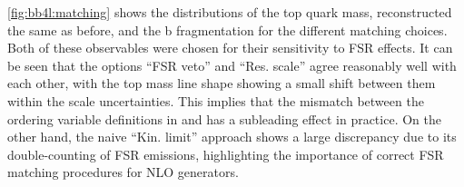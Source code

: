 \cref{fig:bb4l:matching} shows the distributions of the top quark mass, reconstructed the same as before, and the b fragmentation for the different matching choices. Both of these observables were chosen for their sensitivity to FSR effects. It can be seen that the options ``FSR veto'' and ``Res. scale'' agree reasonably well with each other, with the top mass line shape showing a small shift between them within the scale uncertainties. This implies that the mismatch between the ordering variable definitions in \powheg and \pythia has a subleading effect in practice. On the other hand, the naive ``Kin. limit'' approach shows a large discrepancy due to its double-counting of FSR emissions, highlighting the importance of correct FSR matching procedures for NLO generators.





